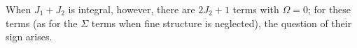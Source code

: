 When $J_1+J_2$ is integral, however, there are $2J_2+1$ terms with $\Omega=0$; for these terms (as for the $\Sigma$ terms when fine structure is neglected), the question of their sign arises.


